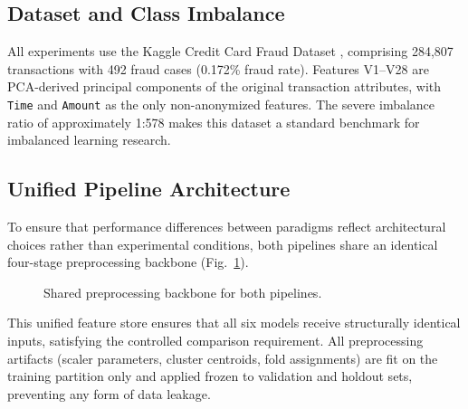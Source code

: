 \documentclass[conference]{IEEEtran}
\begin{document}
\subsection{Dataset and Class Imbalance}

All experiments use the Kaggle Credit Card Fraud Dataset \cite{carcillo2021},
comprising 284,807 transactions with 492 fraud cases (0.172\% fraud rate).
Features V1--V28 are PCA-derived principal components of the original
transaction attributes, with \texttt{Time} and \texttt{Amount} as the only
non-anonymized features. The severe imbalance ratio of approximately 1:578
makes this dataset a standard benchmark for imbalanced learning research.

\subsection{Unified Pipeline Architecture}

To ensure that performance differences between paradigms reflect
architectural choices rather than experimental conditions, both pipelines
share an identical four-stage preprocessing backbone (Fig.~\ref{fig:pipeline}).

\begin{figure}[htbp]
\centering
{}
\caption{Shared preprocessing backbone for both pipelines.}
\label{fig:pipeline}
\end{figure}

This unified feature store ensures that all six models receive structurally
identical inputs, satisfying the controlled comparison requirement. All
preprocessing artifacts (scaler parameters, cluster centroids, fold
assignments) are fit on the training partition only and applied frozen to
validation and holdout sets, preventing any form of data leakage.
\end{document}
